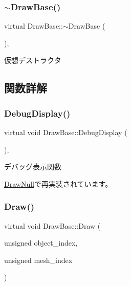 \subsubsection{\texorpdfstring{$\sim$\+Draw\+Base()}{~DrawBase()}}
{\footnotesize\ttfamily virtual Draw\+Base\+::$\sim$\+Draw\+Base (\begin{DoxyParamCaption}{ }\end{DoxyParamCaption})\hspace{0.3cm}{\ttfamily [inline]}, {\ttfamily [virtual]}}



仮想デストラクタ 



\subsection{関数詳解}
\mbox{\label{class_draw_base_a2ba175f791ee01508ffb2be24c68fe7f}} 
\subsubsection{\texorpdfstring{Debug\+Display()}{DebugDisplay()}}
{\footnotesize\ttfamily virtual void Draw\+Base\+::\+Debug\+Display (\begin{DoxyParamCaption}{ }\end{DoxyParamCaption})\hspace{0.3cm}{\ttfamily [inline]}, {\ttfamily [virtual]}}



デバッグ表示関数 



\mbox{\hyperlink{class_draw_null_aa78d05c51ff3943888678b9b2c6bd027}{Draw\+Null}}で再実装されています。

\mbox{\label{class_draw_base_a408080106630a1146d7af0bb46a4d8d1}} 
\subsubsection{\texorpdfstring{Draw()}{Draw()}}
{\footnotesize\ttfamily virtual void Draw\+Base\+::\+Draw (\begin{DoxyParamCaption}\item[{unsigned}]{object\+\_\+index,  }\item[{unsigned}]{mesh\+\_\+index }\end{DoxyParamCaption})\hspace{0.3cm}{\ttfamily [pure virtual]}}



